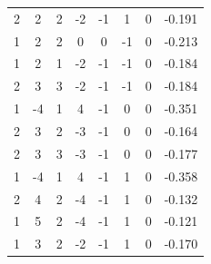 \documentclass[a4paper, 12pt]{article}
\begin{document}
\begin{table}[H]
\begin{tabular}{@{}cccccccc@{}}
    2                      & 2                      & 2                      & -2                     & -1                & 1                 & 0                 & -0.191              \\
    1                      & 2                      & 2                      & 0                      & 0                 & -1                & 0                 & -0.213              \\
    1                      & 2                      & 1                      & -2                     & -1                & -1                & 0                 & -0.184              \\
    2                      & 3                      & 3                      & -2                     & -1                & -1                & 0                 & -0.184              \\
    1                      & -4                     & 1                      & 4                      & -1                & 0                 & 0                 & -0.351              \\
    2                      & 3                      & 2                      & -3                     & -1                & 0                 & 0                 & -0.164              \\
    2                      & 3                      & 3                      & -3                     & -1                & 0                 & 0                 & -0.177              \\
    1                      & -4                     & 1                      & 4                      & -1                & 1                 & 0                 & -0.358              \\
    2                      & 4                      & 2                      & -4                     & -1                & 1                 & 0                 & -0.132              \\
    1                      & 5                      & 2                      & -4                     & -1                & 1                 & 0                 & -0.121              \\
    1                      & 3                      & 2                      & -2                     & -1                & 1                 & 0                 & -0.170              \\ \bottomrule
    \end{tabular}
    \end{table}
\end{document}

